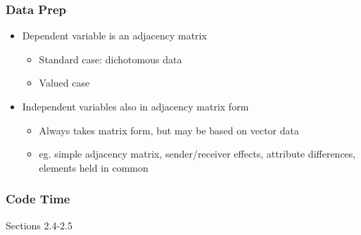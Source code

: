 \documentclass{beamer}
\begin{document}
\begin{frame}
\frametitle{Data Prep}
\begin{itemize}
\pause
\item Dependent variable is an adjacency matrix
\begin{itemize}
\pause
\item Standard case: dichotomous data
\pause
\item Valued case
\end{itemize}
\pause
\item Independent variables also in adjacency matrix form
\begin{itemize}
\pause
\item Always takes matrix form, but may be based on vector data
\pause
\item eg. simple adjacency matrix, sender/receiver effects, attribute differences, elements held in common
\end{itemize}
\end{itemize}
\end{frame}
\begin{frame}
\frametitle{Code Time}
Sections 2.4-2.5
\end{frame}

\end{document}
